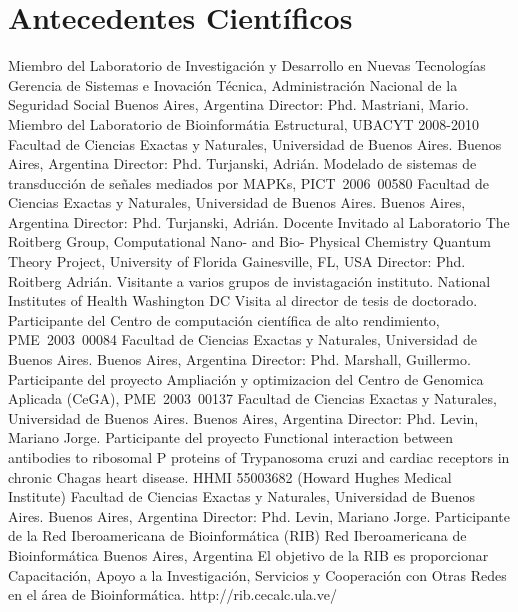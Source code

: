 \section{Antecedentes Científicos}

	{Miembro del Laboratorio de Investigación y Desarrollo en Nuevas Tecnologías}
	{Gerencia de Sistemas e Inovación Técnica, Administración Nacional de la Seguridad Social}
	{Buenos Aires, Argentina}
	{}
	{Director: Phd. Mastriani, Mario.}
	{Miembro del Laboratorio de Bioinformátia Estructural, UBACYT 2008-2010}
	{Facultad de Ciencias Exactas y Naturales, Universidad de Buenos Aires.}
	{Buenos Aires, Argentina}
	{}
	{Director: Phd. Turjanski, Adrián.}
	{Modelado de sistemas de transducción de señales mediados por MAPKs, PICT~2006~00580}
	{Facultad de Ciencias Exactas y Naturales, Universidad de Buenos Aires.}
	{Buenos Aires, Argentina}
	{}
	{Director: Phd. Turjanski, Adrián.}
        {Docente Invitado al Laboratorio The Roitberg Group, Computational Nano- and Bio- Physical Chemistry}
	{Quantum Theory Project, University of Florida}
	{Gainesville, FL, USA}
	{}
	{Director: Phd. Roitberg Adrián.}
	{Visitante a varios grupos de invistagación instituto.}
	{National Institutes of Health}
	{Washington DC}
	{}
	{Visita al director de tesis de doctorado.}
	{Participante del Centro de computación científica de alto rendimiento, PME~2003~00084}
	{Facultad de Ciencias Exactas y Naturales, Universidad de Buenos Aires.}
	{Buenos Aires, Argentina}
	{}
	{Director: Phd. Marshall, Guillermo.}
        {Participante del proyecto Ampliación y optimizacion del Centro de Genomica Aplicada (CeGA), PME~2003~00137}
	{Facultad de Ciencias Exactas y Naturales, Universidad de Buenos Aires.}
	{Buenos Aires, Argentina}
	{}
	{Director: Phd. Levin, Mariano Jorge.}
	{Participante del proyecto Functional interaction between antibodies to ribosomal P proteins of Trypanosoma cruzi and cardiac receptors in chronic Chagas heart disease. HHMI 55003682 (Howard Hughes Medical Institute)}
	{Facultad de Ciencias Exactas y Naturales, Universidad de Buenos Aires.}
	{Buenos Aires, Argentina}
	{}
	{Director: Phd. Levin, Mariano Jorge.}
	{Participante de la Red Iberoamericana de Bioinformática (RIB)}
	{Red Iberoamericana de Bioinformática}
	{Buenos Aires, Argentina}
	{}
	{El objetivo de la RIB es proporcionar Capacitación, Apoyo a la Investigación, Servicios y Cooperación con Otras Redes en el área de Bioinformática. http://rib.cecalc.ula.ve/}

